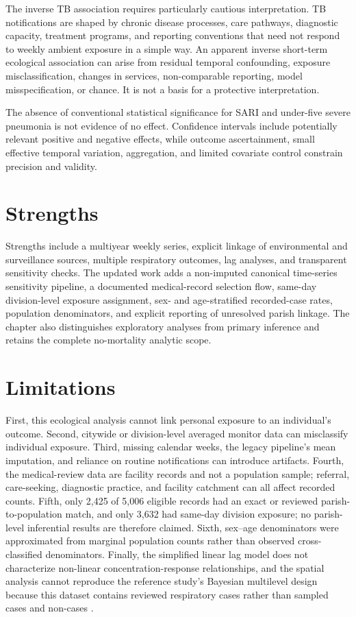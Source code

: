 \documentclass[12pt,a4paper]{report}
\begin{document}
The inverse TB association requires particularly cautious interpretation. TB notifications are shaped by chronic disease processes, care pathways, diagnostic capacity, treatment programs, and reporting conventions that need not respond to weekly ambient exposure in a simple way. An apparent inverse short-term ecological association can arise from residual temporal confounding, exposure misclassification, changes in services, non-comparable reporting, model misspecification, or chance. It is not a basis for a protective interpretation.

The absence of conventional statistical significance for SARI and under-five severe pneumonia is not evidence of no effect. Confidence intervals include potentially relevant positive and negative effects, while outcome ascertainment, small effective temporal variation, aggregation, and limited covariate control constrain precision and validity.

\section{Strengths}
Strengths include a multiyear weekly series, explicit linkage of environmental and surveillance sources, multiple respiratory outcomes, lag analyses, and transparent sensitivity checks. The updated work adds a non-imputed canonical time-series sensitivity pipeline, a documented medical-record selection flow, same-day division-level exposure assignment, sex- and age-stratified recorded-case rates, population denominators, and explicit reporting of unresolved parish linkage. The chapter also distinguishes exploratory analyses from primary inference and retains the complete no-mortality analytic scope.

\section{Limitations}
First, this ecological analysis cannot link personal exposure to an individual's outcome. Second, citywide or division-level averaged monitor data can misclassify individual exposure. Third, missing calendar weeks, the legacy pipeline's mean imputation, and reliance on routine notifications can introduce artifacts. Fourth, the medical-review data are facility records and not a population sample; referral, care-seeking, diagnostic practice, and facility catchment can all affect recorded counts. Fifth, only 2,425 of 5,006 eligible records had an exact or reviewed parish-to-population match, and only 3,632 had same-day division exposure; no parish-level inferential results are therefore claimed. Sixth, sex--age denominators were approximated from marginal population counts rather than observed cross-classified denominators. Finally, the simplified linear lag model does not characterize non-linear concentration-response relationships, and the spatial analysis cannot reproduce the reference study's Bayesian multilevel design because this dataset contains reviewed respiratory cases rather than sampled cases and non-cases \parencite{Adjorlolo2026}.
\end{document}
